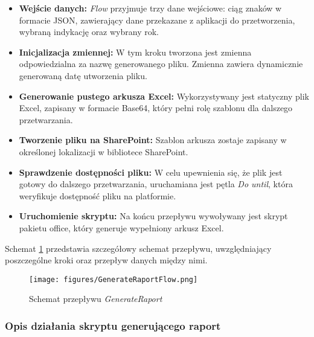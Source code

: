 \begin{itemize}
    \item \textbf{Wejście danych:} \emph{Flow} przyjmuje trzy dane wejściowe: ciąg znaków w formacie JSON, zawierający dane przekazane z aplikacji do przetworzenia, wybraną indykację oraz wybrany rok.
    \item \textbf{Inicjalizacja zmiennej:} W tym kroku tworzona jest zmienna odpowiedzialna za nazwę generowanego pliku. Zmienna zawiera dynamicznie generowaną datę utworzenia pliku.
    \item \textbf{Generowanie pustego arkusza Excel:} Wykorzystywany jest statyczny plik Excel, zapisany w formacie Base64, który pełni rolę szablonu dla dalszego przetwarzania.
    \item \textbf{Tworzenie pliku na SharePoint:} Szablon arkusza zostaje zapisany w określonej lokalizacji w bibliotece SharePoint.
    \item \textbf{Sprawdzenie dostępności pliku:} W celu upewnienia się, że plik jest gotowy do dalszego przetwarzania, uruchamiana jest pętla \emph{Do until}, która weryfikuje dostępność pliku na platformie.
    \item \textbf{Uruchomienie skryptu:} Na końcu przepływu wywoływany jest skrypt pakietu office, który generuje wypełniony arkusz Excel.
\end{itemize}

Schemat \ref{fig:generateflowcomponent} przedstawia szczegółowy schemat przepływu, uwzględniający poszczególne kroki oraz przepływ danych między nimi.

\begin{figure}[H]
    \centering
    \texttt{[image: figures/GenerateRaportFlow.png]}
    \caption{Schemat przepływu \emph{GenerateRaport}}
    \label{fig:generateflowcomponent}
\end{figure}

\subsubsection*{Opis działania skryptu generującego raport}

